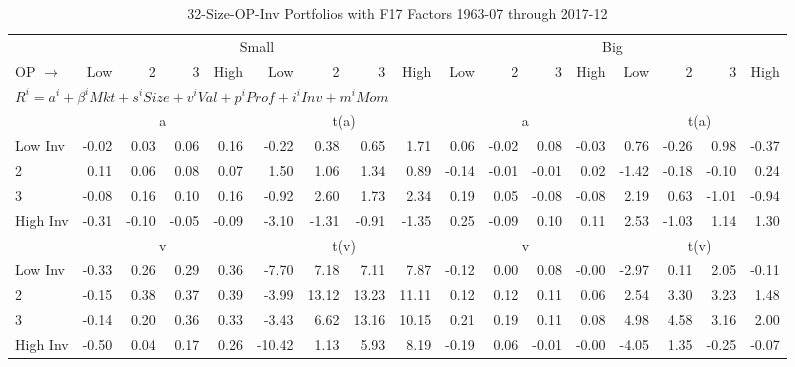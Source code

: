 
\begin{table}[!ht]
\footnotesize
\centering
\caption{32-Size-OP-Inv Portfolios with F17 Factors 1963-07 through 2017-12}
\begin{tabular}{lrrrrrrrrrrrrrrrr}
  \toprule
    & \multicolumn{8}{c}{Small} & \multicolumn{8}{c}{Big} \\
      \cmidrule(r){2-9} \cmidrule(r){10-17}
    OP $\rightarrow$ & Low & 2 & 3 & High & Low & 2 & 3 & High & Low & 2 & 3 & High & Low & 2 & 3 & High \\ 
  \midrule
  \multicolumn{17}{l}{$R^i=a^i+\beta^iMkt+s^iSize+v^iVal+p^iProf+i^iInv+m^iMom$} \\

  
    
      & \multicolumn{4}{c}{a} & \multicolumn{4}{c}{t(a)}
    
      & \multicolumn{4}{c}{a} & \multicolumn{4}{c}{t(a)}
    
    \\
      \cmidrule(r){2-5} \cmidrule(r){6-9} \cmidrule(r){10-13} \cmidrule(r){14-17}

    Low Inv   & -0.02  & 0.03  & 0.06  & 0.16  & -0.22  & 0.38  & 0.65  & 1.71  & 0.06  & -0.02  & 0.08  & -0.03  & 0.76  & -0.26  & 0.98  & -0.37  \\
           2  & 0.11  & 0.06  & 0.08  & 0.07  & 1.50  & 1.06  & 1.34  & 0.89  & -0.14  & -0.01  & -0.01  & 0.02  & -1.42  & -0.18  & -0.10  & 0.24  \\
           3  & -0.08  & 0.16  & 0.10  & 0.16  & -0.92  & 2.60  & 1.73  & 2.34  & 0.19  & 0.05  & -0.08  & -0.08  & 2.19  & 0.63  & -1.01  & -0.94  \\
    High Inv  & -0.31  & -0.10  & -0.05  & -0.09  & -3.10  & -1.31  & -0.91  & -1.35  & 0.25  & -0.09  & 0.10  & 0.11  & 2.53  & -1.03  & 1.14  & 1.30  \\

  
    
      & \multicolumn{4}{c}{v} & \multicolumn{4}{c}{t(v)}
    
      & \multicolumn{4}{c}{v} & \multicolumn{4}{c}{t(v)}
    
    \\
      \cmidrule(r){2-5} \cmidrule(r){6-9} \cmidrule(r){10-13} \cmidrule(r){14-17}

    Low Inv   & -0.33  & 0.26  & 0.29  & 0.36  & -7.70  & 7.18  & 7.11  & 7.87  & -0.12  & 0.00  & 0.08  & -0.00  & -2.97  & 0.11  & 2.05  & -0.11  \\
           2  & -0.15  & 0.38  & 0.37  & 0.39  & -3.99  & 13.12  & 13.23  & 11.11  & 0.12  & 0.12  & 0.11  & 0.06  & 2.54  & 3.30  & 3.23  & 1.48  \\
           3  & -0.14  & 0.20  & 0.36  & 0.33  & -3.43  & 6.62  & 13.16  & 10.15  & 0.21  & 0.19  & 0.11  & 0.08  & 4.98  & 4.58  & 3.16  & 2.00  \\
    High Inv  & -0.50  & 0.04  & 0.17  & 0.26  & -10.42  & 1.13  & 5.93  & 8.19  & -0.19  & 0.06  & -0.01  & -0.00  & -4.05  & 1.35  & -0.25  & -0.07  \\


\end{tabular}
\end{table}
